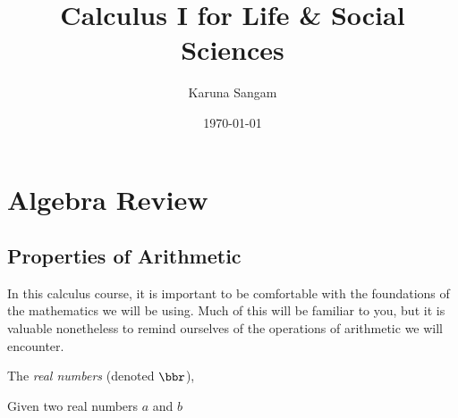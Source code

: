 \documentclass[boxes,serif]{seastaralgebras_expository}
\title{Calculus I for Life \& Social Sciences}
\author{Karuna Sangam} %
\date{\today} %
\begin{document}
\maketitle


\section{Algebra Review}


\subsection{Properties of Arithmetic}

In this calculus course, it is important to be comfortable with the foundations of the mathematics we will be using. Much of this will be familiar to you, but it is valuable nonetheless to remind ourselves of the operations of arithmetic we will encounter.

\begin{defn} \label{def:realnumbers}
    The \emph{real numbers} (denoted $\bbr$), 
\end{defn}

\begin{defn} \label{def:addition}
    Given two real numbers $a$ and $b$
\end{defn}












\end{document}
